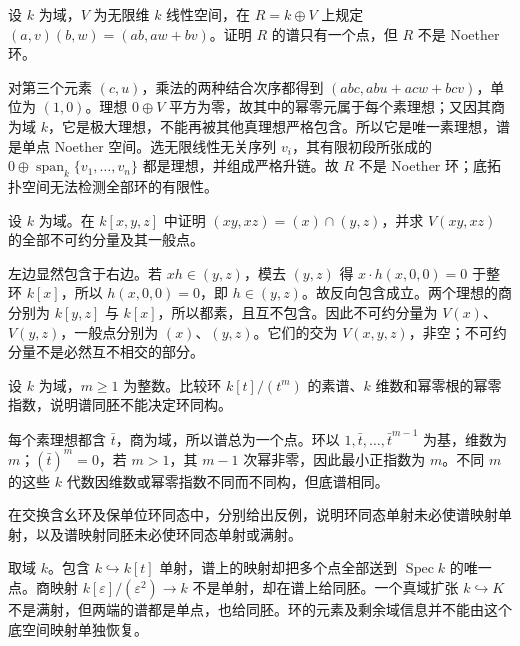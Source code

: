 \begin{exercise}\label{b3:ex:01-noether-topology-not-ring}
	设 \(k\) 为域，\(V\) 为无限维 \(k\) 线性空间，在 \(R=k\oplus V\) 上规定 \((a,v)(b,w)=(ab,aw+bv)\)。证明 \(R\) 的谱只有一个点，但 \(R\) 不是 Noether 环。
\end{exercise}
\begin{solution}
	对第三个元素 \((c,u)\)，乘法的两种结合次序都得到 \((abc,ab u+ac w+bc v)\)，单位为 \((1,0)\)。理想 \(0\oplus V\) 平方为零，故其中的幂零元属于每个素理想；又因其商为域 \(k\)，它是极大理想，不能再被其他真理想严格包含。所以它是唯一素理想，谱是单点 Noether 空间。选无限线性无关序列 \(v_i\)，其有限初段所张成的 \(0\oplus\operatorname{span}_k\{v_1,\ldots,v_n\}\) 都是理想，并组成严格升链。故 \(R\) 不是 Noether 环；底拓扑空间无法检测全部环的有限性。
\end{solution}

\begin{exercise}\label{b3:ex:01-components-plane-line}
	设 \(k\) 为域。在 \(k[x,y,z]\) 中证明 \((xy,xz)=(x)\cap(y,z)\)，并求 \(V(xy,xz)\) 的全部不可约分量及其一般点。
\end{exercise}
\begin{solution}
	左边显然包含于右边。若 \(xh\in(y,z)\)，模去 \((y,z)\) 得 \(x\cdot h(x,0,0)=0\) 于整环 \(k[x]\)，所以 \(h(x,0,0)=0\)，即 \(h\in(y,z)\)。故反向包含成立。两个理想的商分别为 \(k[y,z]\) 与 \(k[x]\)，所以都素，且互不包含。因此不可约分量为 \(V(x)\)、\(V(y,z)\)，一般点分别为 \((x)\)、\((y,z)\)。它们的交为 \(V(x,y,z)\)，非空；不可约分量不是必然互不相交的部分。
\end{solution}

\begin{exercise}\label{b3:ex:01-thickened-point}
	设 \(k\) 为域，\(m\ge1\) 为整数。比较环 \(k[t]/(t^m)\) 的素谱、\(k\) 维数和幂零根的幂零指数，说明谱同胚不能决定环同构。
\end{exercise}
\begin{solution}
	每个素理想都含 \(\bar t\)，商为域，所以谱总为一个点。环以 \(1,\bar t,\ldots,\bar t^{m-1}\) 为基，维数为 \(m\)；\((\bar t)^m=0\)，若 \(m>1\)，其 \(m-1\) 次幂非零，因此最小正指数为 \(m\)。不同 \(m\) 的这些 \(k\) 代数因维数或幂零指数不同而不同构，但底谱相同。
\end{solution}

\begin{exercise}\label{b3:ex:01-maps-direction}
	在交换含幺环及保单位环同态中，分别给出反例，说明环同态单射未必使谱映射单射，以及谱映射同胚未必使环同态单射或满射。
\end{exercise}
\begin{solution}
	取域 \(k\)。包含 \(k\hookrightarrow k[t]\) 单射，谱上的映射却把多个点全部送到 \(\operatorname{Spec}k\) 的唯一点。商映射 \(k[\varepsilon]/(\varepsilon^2)\rightarrow k\) 不是单射，却在谱上给同胚。一个真域扩张 \(k\hookrightarrow K\) 不是满射，但两端的谱都是单点，也给同胚。环的元素及剩余域信息并不能由这个底空间映射单独恢复。
\end{solution}


